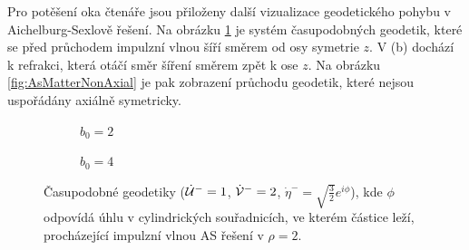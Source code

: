 Pro potěšení oka čtenáře jsou přiloženy další vizualizace geodetického pohybu v Aichelburg-Sexlově řešení. Na obrázku \ref{fig:AsMatter02} je systém časupodobných geodetik, které se před
průchodem impulzní vlnou šíří směrem od osy symetrie $z$. V (b) dochází k refrakci, která otáčí směr šíření směrem zpět k ose $z$.
Na obrázku \ref{fig:AsMatterNonAxial} je pak zobrazení průchodu geodetik, které nejsou uspořádány axiálně symetricky.

\begin{figure}[ht]
    \centering
    \begin{subfigure}[b]{0.45\textwidth}
        \caption{$b_0 = 2$}
    \end{subfigure}
    \hfill
    \begin{subfigure}[b]{0.45\textwidth}
        \caption{$b_0 = 4$}
    \end{subfigure}
    \caption{Časupodobné geodetiky ($\dot {\mathcal{U}}^-=1$, $\dot {\mathcal{V}}^-=2$, $\dot \eta^-=\sqrt{\frac{3}{2}} e^{i \phi}$), kde $\phi$ odpovídá úhlu v
    cylindrických souřadnicích, ve kterém částice leží, procházející impulzní vlnou AS řešení v $\rho=2$.}
    \label{fig:AsMatter02}
\end{figure}


